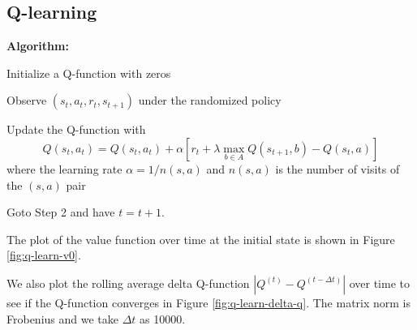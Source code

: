 \documentclass{article}
\begin{document}
\subsection{Q-learning}

\textbf{Algorithm:}
\begin{steps}
  \item Initialize a Q-function with zeros
  \item Observe $(s_t, a_t, r_t, s_{t+1})$ under the randomized policy
  \item Update the Q-function with
  \begin{equation*}
    Q(s_t, a_t) = Q(s_t, a_t) + \alpha [r_t + \lambda\max_{b \in A} Q(s_{t+1}, b) - Q(s_t, a)]
  \end{equation*}
  where the learning rate $\alpha = 1 / n(s, a)$ and $n(s, a)$ is the number of visits
  of the $(s, a)$ pair
  \item Goto Step 2 and have $t = t + 1$.
\end{steps}

The plot of the value function over time at the initial state is shown in Figure
\ref{fig:q-learn-v0}.

We also plot the rolling average delta Q-function $|Q^{(t)} - Q^{(t-\Delta t)}|$ over time
to see if the Q-function converges in Figure \ref{fig:q-learn-delta-q}.
The matrix norm is Frobenius and
we take $\Delta t$ as 10000.
\end{document}
